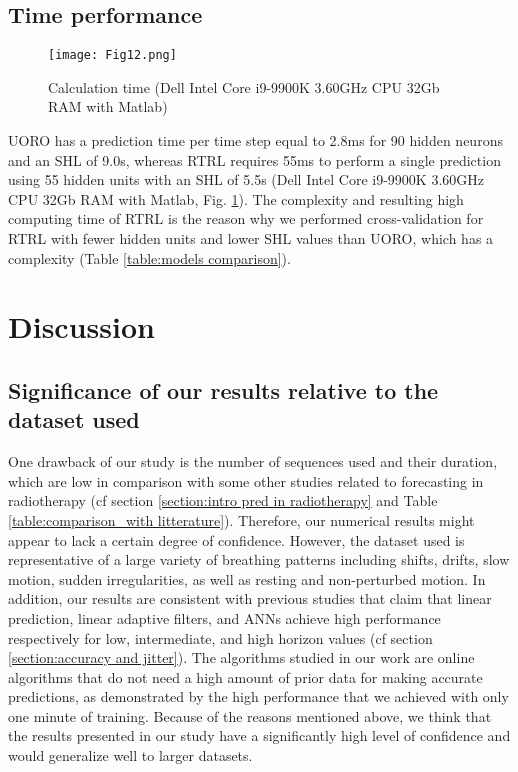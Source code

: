 \documentclass[twocolumn,a4paper]{svjour3} \sloppy          \smartqed
\begin{document}
\subsection{Time performance}

\begin{figure}[htb!]
\centering
\texttt{[image: Fig12.png]}
\caption{Calculation time (Dell Intel Core i9-9900K 3.60GHz CPU 32Gb RAM with Matlab)} 
\label{fig:prediction time}
\end{figure}

UORO has a prediction time per time step equal to 2.8ms for 90 hidden neurons and an SHL of 9.0s, whereas RTRL requires 55ms to perform a single prediction using 55 hidden units with an SHL of 5.5s (Dell Intel Core i9-9900K 3.60GHz CPU 32Gb RAM with Matlab, Fig. \ref{fig:prediction time}). The complexity  and resulting high computing time of RTRL is the reason why we performed cross-validation for RTRL with fewer hidden units and lower SHL values than UORO, which has a complexity  (Table \ref{table:models comparison}).


\section{Discussion}

\subsection{Significance of our results relative to the dataset used}
\label{section: comments on dataset}

One drawback of our study is the number of sequences used and their duration, which are low in comparison with some other studies related to forecasting in radiotherapy (cf section \ref{section:intro pred in radiotherapy} and Table \ref{table:comparison_with litterature}). Therefore, our numerical results might appear to lack a certain degree of confidence. However, the dataset used is representative of a large variety of breathing patterns including shifts, drifts, slow motion, sudden irregularities, as well as resting and non-perturbed motion. In addition, our results are consistent with previous studies that claim that linear prediction, linear adaptive filters, and ANNs achieve high performance respectively for low, intermediate, and high horizon values (cf section \ref{section:accuracy and jitter}). The algorithms studied in our work are online algorithms that do not need a high amount of prior data for making accurate predictions, as demonstrated by the high performance that we achieved with only one minute of training. Because of the reasons mentioned above, we think that the results presented in our study have a significantly high level of confidence and would generalize well to larger datasets.
\end{document}
